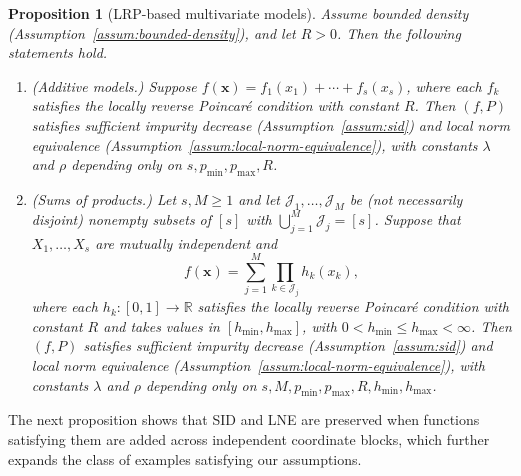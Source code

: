 \documentclass[11pt]{article}
\theoremstyle{plain}
\newtheorem{proposition}[theorem]{Proposition}
\theoremstyle{definition}
\theoremstyle{remark}
\theoremstyle{plain}
\newcommand{\bx}{\mathbf{x}}
\newcommand{\1}{\mathbbm{1}}
\begin{document}

\begin{proposition}[LRP-based multivariate models]\label{prop:sid-suffi}
    Assume bounded density (Assumption~\ref{assum:bounded-density}), and let $R>0$.
    Then the following statements hold.
    \begin{enumerate}
        \item[\textup{(i)}] \textup{(Additive models.)}
        Suppose $f(\bx)=f_1(x_1)+\cdots+f_s(x_s)$, where
        each $f_k$ satisfies the locally reverse Poincar\'e condition
        with constant $R$.
        Then $(f,P)$ satisfies sufficient impurity decrease
        (Assumption~\ref{assum:sid}) and local norm equivalence
        (Assumption~\ref{assum:local-norm-equivalence}), with constants $\lambda$ and $\rho$ depending only on
        $s,p_{\min},p_{\max},R$.

        \item[\textup{(ii)}] \textup{(Sums of products.)}
        Let $s,M\geq 1$ and let
        $\mathcal{J}_1,\ldots,\mathcal{J}_M$ be (not
        necessarily disjoint) nonempty subsets of $[s]$ with
        $\bigcup_{j=1}^{M}\mathcal{J}_j=[s]$. Suppose that
        $X_1,\ldots,X_s$ are mutually independent and
        \[
        f(\bx)=\sum_{j=1}^{M}\prod_{k\in\mathcal{J}_j}h_k(x_k),
        \]
        where each $h_k\colon[0,1]\to\mathbb{R}$ satisfies the locally
        reverse Poincar\'e condition with constant $R$ and takes values in
        $[h_{\min},h_{\max}]$, with
        $0<h_{\min}\le h_{\max}<\infty$.
        Then $(f,P)$ satisfies sufficient impurity decrease (Assumption~\ref{assum:sid}) and local norm equivalence (Assumption~\ref{assum:local-norm-equivalence}), with constants $\lambda$ and $\rho$ depending only on $s,M,p_{\min},p_{\max},R,h_{\min},h_{\max}$.
    \end{enumerate}
\end{proposition}

The next proposition shows that SID and LNE are preserved when functions satisfying
them are added across independent coordinate blocks, which further expands the class of examples satisfying our assumptions.
\end{document}
